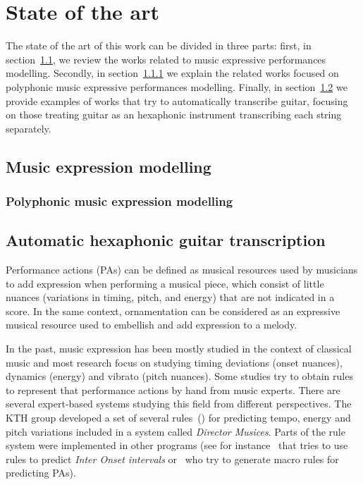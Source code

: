\normallinespacing
\chapter{State of the art}
\label{chap:sota}
The state of the art of this work can be divided in three parts: first, in section~\ref{sec:muexpmod}, we review the works related to music expressive performances modelling. Secondly, in section~\ref{sec:polymuexpmod} we explain the related works focused on polyphonic music expressive performances modelling. Finally, in section~\ref{sec:autohexaguit} we provide examples of works that try to automatically transcribe guitar, focusing on those treating guitar as an hexaphonic instrument transcribing each string separately.

\section{Music expression modelling}
\label{sec:muexpmod}
\subsection{Polyphonic music expression modelling}
\label{sec:polymuexpmod}
\section{Automatic hexaphonic guitar transcription}
\label{sec:autohexaguit}


Performance actions (PAs) can be defined as musical resources used by musicians to add expression when performing a musical piece, which consist of little nuances (variations in timing, pitch, and energy) that are not indicated in a score. In the same context, ornamentation can be considered as an expressive musical resource used to embellish and add expression to a melody. 

In the past, music expression has been mostly studied in the context of classical music and most research focus on studying timing deviations (onset nuances), dynamics (energy) and vibrato (pitch nuances). Some studies try to obtain rules to represent that performance actions by hand from music experts. There are several expert-based systems studying this field from different perspectives. The KTH group developed a set of several rules~(\cite{Friberg2009}) for predicting tempo, energy and pitch variations included in a system called \textit{Director Musices}. Parts of the rule system were implemented in other programs (see for instance~\cite{Sundberg2003} that tries to use rules to predict \textit{Inter Onset intervals} or~\cite{Bresin2000} who try to generate macro rules for predicting PAs).

